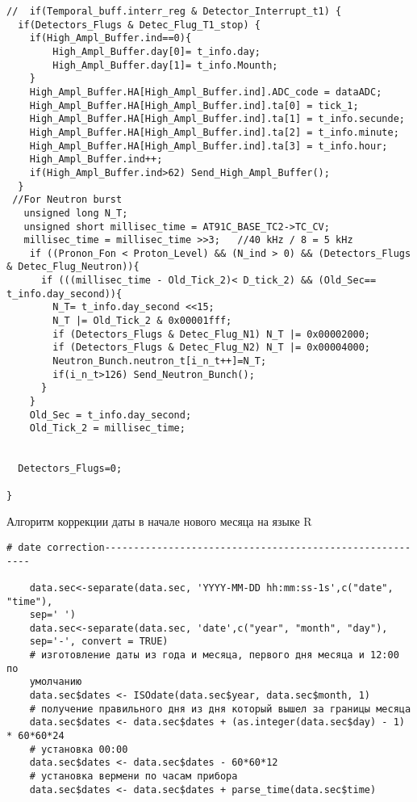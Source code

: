 \begin{lstlisting}[language={[ISO]C++}]
//  if(Temporal_buff.interr_reg & Detector_Interrupt_t1) {
  if(Detectors_Flugs & Detec_Flug_T1_stop) {
    if(High_Ampl_Buffer.ind==0){
        High_Ampl_Buffer.day[0]= t_info.day;
        High_Ampl_Buffer.day[1]= t_info.Mounth;
    }    
    High_Ampl_Buffer.HA[High_Ampl_Buffer.ind].ADC_code = dataADC;
    High_Ampl_Buffer.HA[High_Ampl_Buffer.ind].ta[0] = tick_1;
    High_Ampl_Buffer.HA[High_Ampl_Buffer.ind].ta[1] = t_info.secunde;
    High_Ampl_Buffer.HA[High_Ampl_Buffer.ind].ta[2] = t_info.minute;
    High_Ampl_Buffer.HA[High_Ampl_Buffer.ind].ta[3] = t_info.hour;
    High_Ampl_Buffer.ind++;
    if(High_Ampl_Buffer.ind>62) Send_High_Ampl_Buffer();    
  }     
 //For Neutron burst 
   unsigned long N_T;
   unsigned short millisec_time = AT91C_BASE_TC2->TC_CV;
   millisec_time = millisec_time >>3;   //40 kHz / 8 = 5 kHz
    if ((Pronon_Fon < Proton_Level) && (N_ind > 0) && (Detectors_Flugs & Detec_Flug_Neutron)){      
      if (((millisec_time - Old_Tick_2)< D_tick_2) && (Old_Sec== t_info.day_second)){
        N_T= t_info.day_second <<15;
        N_T |= Old_Tick_2 & 0x00001fff;
        if (Detectors_Flugs & Detec_Flug_N1) N_T |= 0x00002000;
        if (Detectors_Flugs & Detec_Flug_N2) N_T |= 0x00004000;
        Neutron_Bunch.neutron_t[i_n_t++]=N_T;
        if(i_n_t>126) Send_Neutron_Bunch();
      }
    }
    Old_Sec = t_info.day_second;
    Old_Tick_2 = millisec_time;        
   
  
  Detectors_Flugs=0;

}	
\end{lstlisting}




\begin{ListingEnv}[H]
	\caption{Алгоритм коррекции даты в начале нового месяца на языке R}
	\label{list:datecor}
	\begin{lstlisting}[language={Renhanced}]
	# date correction---------------------------------------------------------
	
	data.sec<-separate(data.sec, 'YYYY-MM-DD hh:mm:ss-1s',c("date", "time"),
	sep=' ')
	data.sec<-separate(data.sec, 'date',c("year", "month", "day"),
	sep='-', convert = TRUE)
	# изготовление даты из года и месяца, первого дня месяца и 12:00 по 
	умолчанию
	data.sec$dates <- ISOdate(data.sec$year, data.sec$month, 1)
	# получение правильного дня из дня который вышел за границы месяца
	data.sec$dates <- data.sec$dates + (as.integer(data.sec$day) - 1) * 60*60*24
	# установка 00:00  
	data.sec$dates <- data.sec$dates - 60*60*12 
	# установка вермени по часам прибора
	data.sec$dates <- data.sec$dates + parse_time(data.sec$time)
	
	\end{lstlisting}
\end{ListingEnv}

